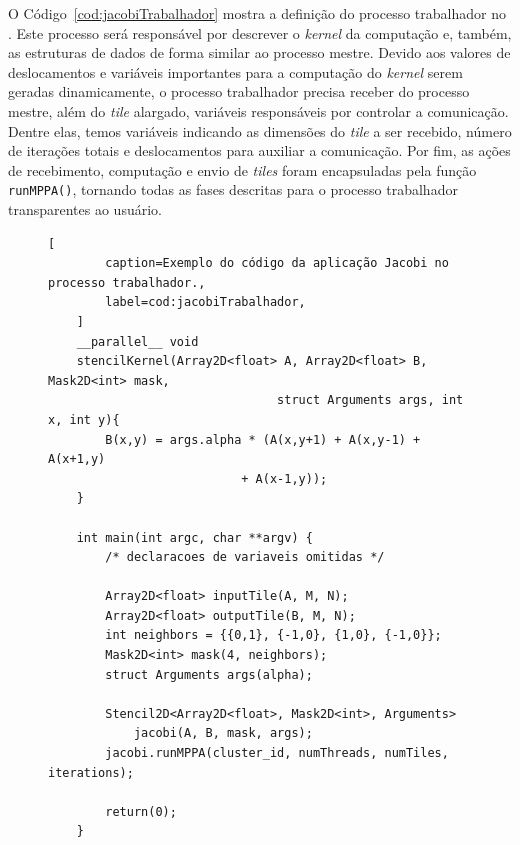 
%
O Código~\ref{cod:jacobiTrabalhador} mostra a definição do processo trabalhador
no \mppa. Este processo será responsável por descrever o \textit{kernel} da
computação e, também, as estruturas de dados de forma similar ao processo mestre.
Devido aos valores de deslocamentos e variáveis importantes para a computação
do \textit{kernel} serem geradas dinamicamente, o processo trabalhador precisa
receber do processo mestre, além do \textit{tile} alargado, variáveis
responsáveis por controlar a comunicação. Dentre elas, temos variáveis indicando
as dimensões do \textit{tile} a ser recebido, número de iterações totais e
deslocamentos para auxiliar a comunicação. Por fim, as ações de recebimento,
computação e envio de \textit{tiles} foram encapsuladas pela função
\texttt{runMPPA()}, tornando todas as fases descritas para o processo
trabalhador transparentes ao usuário.


\begin{figure}[t]
    \begin{lstlisting}[
		caption=Exemplo do código da aplicação Jacobi no processo trabalhador.,
		label=cod:jacobiTrabalhador,
	]
	__parallel__ void
	stencilKernel(Array2D<float> A, Array2D<float> B, Mask2D<int> mask,
								struct Arguments args, int x, int y){
		B(x,y) = args.alpha * (A(x,y+1) + A(x,y-1) + A(x+1,y)
                           + A(x-1,y));
	}

	int main(int argc, char **argv) {
		/* declaracoes de variaveis omitidas */

		Array2D<float> inputTile(A, M, N);
		Array2D<float> outputTile(B, M, N);
		int neighbors = {{0,1}, {-1,0}, {1,0}, {-1,0}};
		Mask2D<int> mask(4, neighbors);
		struct Arguments args(alpha);

		Stencil2D<Array2D<float>, Mask2D<int>, Arguments>
			jacobi(A, B, mask, args);
		jacobi.runMPPA(cluster_id, numThreads, numTiles, iterations);

		return(0);
	}
\end{lstlisting}
\end{figure}


